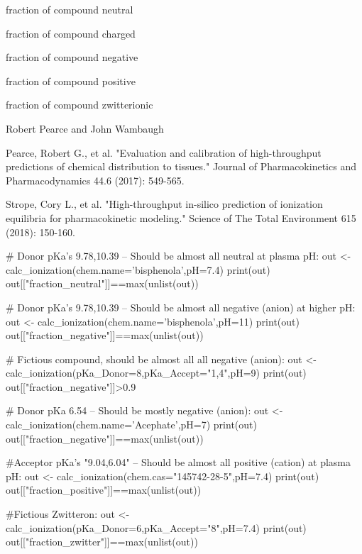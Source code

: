 \documentclass[a4paper]{book}
\begin{document}
%
\begin{Value}
\begin{ldescription}
\item[\code{fraction\_neutral}] fraction of compound neutral
\item[\code{fraction\_charged}] fraction of compound charged
\item[\code{fraction\_negative}] fraction of compound negative
\item[\code{fraction\_positive}] fraction of compound positive
\item[\code{fraction\_zwitter}] fraction of compound zwitterionic
\end{ldescription}
\end{Value}
%
\begin{Author}\relax
Robert Pearce and John Wambaugh
\end{Author}
%
\begin{References}\relax
Pearce, Robert G., et al. "Evaluation and calibration of
high-throughput predictions of chemical distribution to tissues." Journal of
Pharmacokinetics and Pharmacodynamics 44.6 (2017): 549-565.

Strope, Cory L., et al. "High-throughput in-silico prediction of ionization 
equilibria for pharmacokinetic modeling." Science of The Total Environment 
615 (2018): 150-160.
\end{References}
%
\begin{Examples}
\begin{ExampleCode}
# Donor pKa's 9.78,10.39 -- Should be almost all neutral at plasma pH:
out <- calc_ionization(chem.name='bisphenola',pH=7.4)
print(out)
out[["fraction_neutral"]]==max(unlist(out))

# Donor pKa's 9.78,10.39 -- Should be almost all negative (anion) at higher pH:
out <- calc_ionization(chem.name='bisphenola',pH=11)
print(out)
out[["fraction_negative"]]==max(unlist(out))

# Fictious compound, should be almost all all negative (anion):
out <- calc_ionization(pKa_Donor=8,pKa_Accept="1,4",pH=9)
print(out)
out[["fraction_negative"]]>0.9

# Donor pKa 6.54 -- Should be mostly negative (anion):
out <- calc_ionization(chem.name='Acephate',pH=7)
print(out)
out[["fraction_negative"]]==max(unlist(out))

#Acceptor pKa's "9.04,6.04"  -- Should be almost all positive (cation) at plasma pH:
out <- calc_ionization(chem.cas="145742-28-5",pH=7.4)
print(out)
out[["fraction_positive"]]==max(unlist(out))

#Fictious Zwitteron:
out <- calc_ionization(pKa_Donor=6,pKa_Accept="8",pH=7.4)
print(out)
out[["fraction_zwitter"]]==max(unlist(out))

\end{ExampleCode}
\end{Examples}
\end{document}
